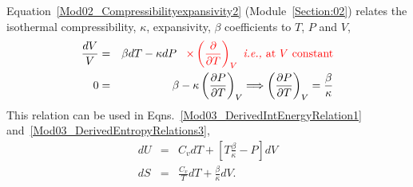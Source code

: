 \documentclass[12pts,a4paper,amsmath,amssymb,floatfix]{article}%
\newcommand{\frc}{\displaystyle\frac}
\newcommand{\red}{\textcolor{red}}
\newcommand{\ie}{{\it i.e., }}
\newcommand{\Partial}[3][error]{\left(\frc{\partial #1}{\partial #2}\right)_{#3}}
\begin{document}
Equation~\ref{Mod02_Compressibilityexpansivity2} (Module~\ref{Section:02}) relates the isothermal compressibility, $\kappa$, expansivity, $\beta$ coefficients to $T$, $P$ and $V$,
     \begin{eqnarray}
        \frc{dV}{V} &=& \beta dT - \kappa dP \;\;\;\red{\times\Partial[]{T}{V} \nonumber \text{ \ie at }V\text{ constant}} \nonumber \\
            0       &=& \beta - \kappa\Partial[P]{T}{V} \Longrightarrow \Partial[P]{T}{V} = \frc{\beta}{\kappa} \nonumber
     \end{eqnarray}
This relation can be used in Eqns.~\ref{Mod03_DerivedIntEnergyRelation1} and~\ref{Mod03_DerivedEntropyRelations3},
     \begin{eqnarray}
        dU &=& C_{v}dT + \left[T\frc{\beta}{\kappa}-P\right]dV\label{Mod03_DerivedIntEnergyRelation2} \\
        dS &=& \frc{C_{v}}{T}dT + \frc{\beta}{\kappa}dV.\label{Mod03_DerivedEntropyRelations4}
     \end{eqnarray}
\end{document}

